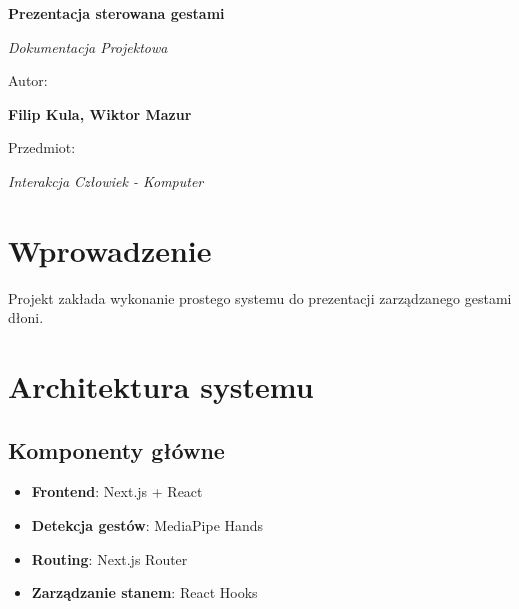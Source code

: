 \documentclass[12pt,a4paper]{article}
\begin{document}
\begin{titlepage}
    \begin{center}
        \vspace*{2cm}
        {\huge\bfseries Prezentacja sterowana gestami\par}
        \vspace{1.5cm}
        {\Large\itshape Dokumentacja Projektowa\par}
        \vspace{1.5cm}
        {\large Autor:\par}
        {\large\bfseries Filip Kula, Wiktor Mazur\par}
        \vspace{1cm}
        {\large Przedmiot:\par}
        {\large\itshape Interakcja Człowiek - Komputer\par}
    \end{center}
\end{titlepage}

\newpage

\section{Wprowadzenie}
Projekt zakłada wykonanie prostego systemu do prezentacji zarządzanego gestami dłoni.

\section{Architektura systemu}
\subsection{Komponenty główne}
\begin{itemize}
    \item \textbf{Frontend}: Next.js + React
    \item \textbf{Detekcja gestów}: MediaPipe Hands
    \item \textbf{Routing}: Next.js Router
    \item \textbf{Zarządzanie stanem}: React Hooks
\end{itemize}
\end{document}
